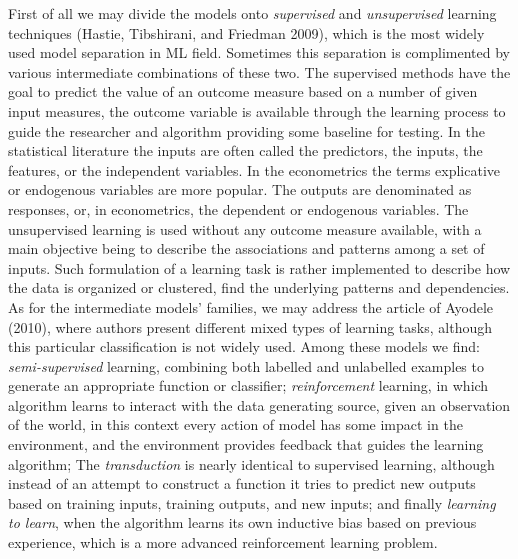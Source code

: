\documentclass[11pt,]{article}
\begin{document}
First of all we may divide the models onto \emph{supervised} and
\emph{unsupervised} learning techniques (Hastie, Tibshirani, and
Friedman 2009), which is the most widely used model separation in ML
field. Sometimes this separation is complimented by various intermediate
combinations of these two. The supervised methods have the goal to
predict the value of an outcome measure based on a number of given input
measures, the outcome variable is available through the learning process
to guide the researcher and algorithm providing some baseline for
testing. In the statistical literature the inputs are often called the
predictors, the inputs, the features, or the independent variables. In
the econometrics the terms explicative or endogenous variables are more
popular. The outputs are denominated as responses, or, in econometrics,
the dependent or endogenous variables. The unsupervised learning is used
without any outcome measure available, with a main objective being to
describe the associations and patterns among a set of inputs. Such
formulation of a learning task is rather implemented to describe how the
data is organized or clustered, find the underlying patterns and
dependencies. As for the intermediate models' families, we may address
the article of Ayodele (2010), where authors present different mixed
types of learning tasks, although this particular classification is not
widely used. Among these models we find: \emph{semi-supervised}
learning, combining both labelled and unlabelled examples to generate an
appropriate function or classifier; \emph{reinforcement} learning, in
which algorithm learns to interact with the data generating source,
given an observation of the world, in this context every action of model
has some impact in the environment, and the environment provides
feedback that guides the learning algorithm; The \emph{transduction} is
nearly identical to supervised learning, although instead of an attempt
to construct a function it tries to predict new outputs based on
training inputs, training outputs, and new inputs; and finally
\emph{learning to learn}, when the algorithm learns its own inductive
bias based on previous experience, which is a more advanced
reinforcement learning problem.
\end{document}

